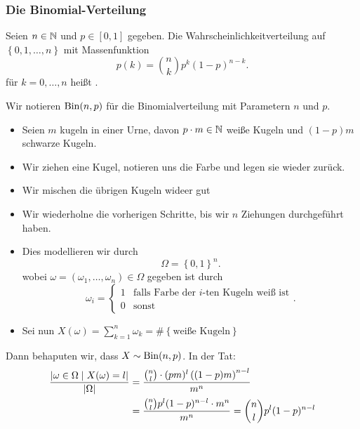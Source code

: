 \subsubsection{Die Binomial-Verteilung}
\begin{definition}
    Seien $n\in \mathbb{N}$ und $p\in [0,1]$ gegeben. Die Wahrscheinlichkeitverteilung auf $\left \{0,1,\ldots,n\right\} $ mit Massenfunktion
    \[
        p(k) = \binom{n}{k}p^k(1-p)^{n-k}
    .\] 
    für $k=0,\ldots,n$ heißt . 
\end{definition}
\begin{notation}
    Wir notieren $\operatorname{Bin}(n,p)$ für die Binomialverteilung mit Parametern  $n$ und  $p$.
\end{notation}

\begin{example}
    \begin{itemize}
        \item Seien $m$ kugeln in einer Urne, davon  $p\cdot m\in \mathbb{N}$ weiße Kugeln und $(1-p)m$ schwarze Kugeln.
        \item Wir ziehen eine Kugel, notieren uns die Farbe und legen sie wieder zurück.
        \item Wir mischen die übrigen Kugeln wideer gut
        \item Wir wiederholne die vorherigen Schritte, bis wir $n$ Ziehungen durchgeführt haben.
        \item Dies modellieren wir durch
            \[
            \Omega = \left \{0,1\right\} ^n
            .\] 
            wobei $\omega=(\omega_1,\ldots,\omega_n) \in \Omega$ gegeben ist durch
            \[
            \omega_i = \begin{cases}
                1 & \text{falls Farbe der $i$-ten Kugeln weiß ist} \\
                0 &\text{sonst}
            \end{cases}
            .\] 
        \item Sei nun $X(\omega) = \sum_{k=1}^n \omega_k = \# \left \{\text{weiße Kugeln} \right\} $
    \end{itemize}
    Dann behaputen wir, dass $X \sim  \operatorname{Bin}(n,p)$. In der Tat:
    \begin{equation}
        \begin{split}
            \frac{\lvert\omega\in \Omega \mid  X(\omega) = l\rvert}{\lvert\Omega\rvert } &= \frac{\binom{n}{l} \cdot  (pm)^{l}\left( (1-p)m \right)  ^{n-l}}{m^n} \\
                                                                             &= \frac{\binom{n}{l}p^l (1-p)^{n-l}\cdot m^n}{m^n} = \binom{n}{l}p^l(1-p)^{n-l}
        \end{split}
    \end{equation}
\end{example}
